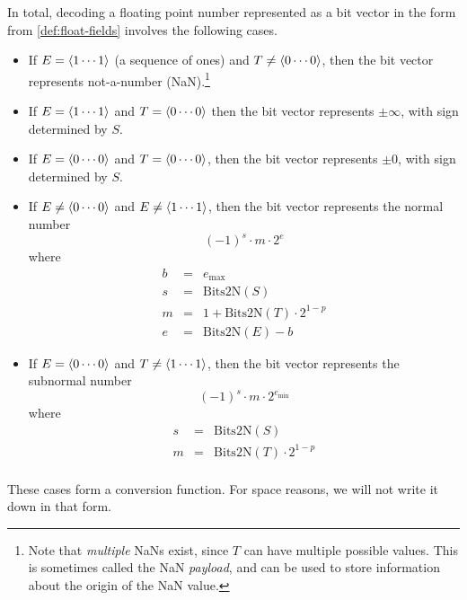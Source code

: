 In total, decoding a floating point number represented as a bit vector
in the form from \cref{def:float-fields} involves the following cases.

\begin{itemize}
\item If $E = \langle 1\cdots{} 1 \rangle$ (a sequence of ones) and
  $T \neq \langle 0\cdots{} 0 \rangle$, then the bit vector represents
  not-a-number (NaN).\footnote{Note that \emph{multiple} NaNs exist,
    since $T$ can have multiple possible values.  This is sometimes
    called the NaN \emph{payload}, and can be used to store
    information about the origin of the NaN value.}
\item If $E = \langle 1\cdots{} 1 \rangle$ and
  $T = \langle 0\cdots{} 0 \rangle$ then the bit vector represents
  $\pm\infty$, with sign determined by $S$.
\item If $E = \langle 0\cdots{} 0 \rangle$ and
  $T = \langle 0\cdots{} 0 \rangle$, then the bit vector represents
  $\pm 0$, with sign determined by $S$.
\item If $E \neq \langle 0\cdots{} 0 \rangle$ and
  $E \neq \langle 1\cdots{} 1 \rangle$, then the bit vector represents the
  normal number
  \[
    (-1)^{s} \cdot m \cdot 2^e
  \]
  where
  \[
    \begin{array}{ccr}
      b &=& e_{\text{max}} \\
      s &=& \mathrm{Bits2N}(S) \\
      m &=& 1+\mathrm{Bits2N}(T) \cdot{} 2^{1-p} \\
      e &=& \mathrm{Bits2N}(E) - b
    \end{array}
  \]
\item If $E = \langle 0\cdots{} 0 \rangle$ and
  $T \neq \langle 1\cdots{} 1 \rangle$, then the bit vector represents the
  subnormal number
  \[
    (-1)^{s} \cdot m \cdot 2^{e_{\text{min}}}
  \]
  where
  \[
    \begin{array}{ccr}
      s &=& \mathrm{Bits2N}(S) \\
      m &=& \mathrm{Bits2N}(T) \cdot{} 2^{1-p} \\
    \end{array}
  \]
\end{itemize}

These cases form a conversion function.  For space reasons, we will
not write it down in that form.

